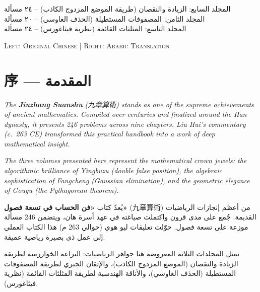 \documentclass[11pt,a4paper]{article}
\newcommand{\ar}[1]{\arabicfont\beginR #1\endR}
\newcommand{\ChinCol}[1]{\begin{minipage}[t]{0.48\textwidth}#1\end{minipage}}
\newcommand{\ArabCol}[1]{\begin{minipage}[t]{0.48\textwidth}\arabicfont\beginR #1\endR\end{minipage}}
\newcommand{\parallelsection}[2]{%
  \noindent\ChinCol{#1}\hfill\ArabCol{#2}\par\vspace{0.5cm}%
}
\begin{document}
\begin{titlepage}
\begin{center}
\vfill

{\small\arabicfont\beginR\color{notecolor}
المجلد السابع: الزيادة والنقصان (طريقة الموضع المزدوج الكاذب) -- ٢٤ مسألة\\
المجلد الثامن: المصفوفات المستطيلة (الحذف الغاوسي) -- ٢٠ مسألة\\
المجلد التاسع: المثلثات القائمة (نظرية فيثاغورس) -- ٢٤ مسألة
\endR}

\vspace{0.3cm}

{\small\textsc{Left: Original Chinese \quad | \quad Right: Arabic Translation}}

\end{center}
\end{titlepage}

\tableofcontents
\newpage

\section*{序 --- \ar{المقدمة}}

\parallelsection{%
\textit{The \textbf{Jiuzhang Suanshu} (九章算術) stands as one of the supreme achievements of ancient mathematics. Compiled over centuries and finalized around the Han dynasty, it presents 246 problems across nine chapters. Liu Hui's commentary (c.~263 CE) transformed this practical handbook into a work of deep mathematical insight.}

\textit{The three volumes presented here represent the mathematical crown jewels: the algorithmic brilliance of Yingbuzu (double false position), the algebraic sophistication of Fangcheng (Gaussian elimination), and the geometric elegance of Gougu (the Pythagorean theorem).}
}{%
يُعدّ كتاب \textbf{«فن الحساب في تسعة فصول»} (九章算術) من أعظم إنجازات الرياضيات القديمة. جُمع على مدى قرون واكتملت صياغته في عهد أسرة هان، ويتضمن 246 مسألة موزعة على تسعة فصول. حوّلت تعليقات ليو هوي (حوالي 263 م) هذا الكتاب العملي إلى عمل ذي بصيرة رياضية عميقة.

تمثل المجلدات الثلاثة المعروضة هنا جواهر الرياضيات: البراعة الخوارزمية لطريقة الزيادة والنقصان (الموضع المزدوج الكاذب)، والإتقان الجبري لطريقة المصفوفات المستطيلة (الحذف الغاوسي)، والأناقة الهندسية لطريقة المثلثات القائمة (نظرية فيثاغورس).
}
\end{document}
